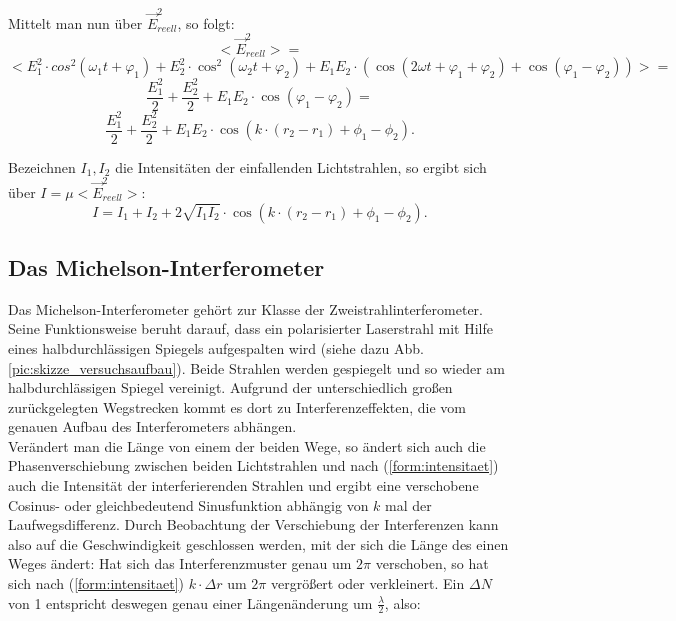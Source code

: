 Mittelt man nun über $  \vec{E}_{reell} ^{2} $, so folgt: 
\begin{equation}
\nonumber
<\vec{E}_{reell}^{2}> = 
\end{equation}
\begin{equation}
\nonumber
< E_{1}^{2} \cdot cos^{2}(\omega_{1}t + \varphi_{1}) + E_{2}^{2} \cdot \cos^{2}(\omega_{2}t + \varphi_{2}) + E_{1}E_{2} \cdot (\cos(2\omega t + \varphi_{1} + \varphi_{2}) + \cos(\varphi_{1} - \varphi_{2})) > = 
\end{equation}
\begin{equation}
\nonumber
\frac{E_{1}^{2}}{2} + \frac{E_{2}^{2}}{2} + E_{1}E_{2} \cdot \cos(\varphi_{1} - \varphi_{2}) = 
\end{equation}
\begin{equation}
\frac{E_{1}^{2}}{2} + \frac{E_{2}^{2}}{2} + E_{1}E_{2} \cdot \cos( k \cdot (r_{2} - r_{1}) + \phi_{1} - \phi_{2}).
\end{equation}

Bezeichnen $ I_{1}, I_{2} $ die Intensitäten der einfallenden Lichtstrahlen, so ergibt sich über $ I = \mu <\vec{E}_{reell}^{2}> $: 
\begin{equation}
\label{form:intensitaet}
I = I_{1} + I_{2} + 2 \sqrt{I_{1} I_{2}} \cdot \cos( k \cdot (r_{2} - r_{1}) + \phi_{1} - \phi_{2}).
\end{equation}





\subsection{Das Michelson-Interferometer}

Das Michelson-Interferometer gehört zur Klasse der Zweistrahlinterferometer. Seine Funktionsweise beruht darauf, 
dass ein polarisierter Laserstrahl mit Hilfe eines halbdurchlässigen Spiegels aufgespalten wird (siehe dazu Abb.
\ref{pic:skizze_versuchsaufbau}). Beide Strahlen werden gespiegelt und so wieder am halbdurchlässigen Spiegel 
vereinigt. Aufgrund der unterschiedlich großen zurückgelegten Wegstrecken kommt es dort zu Interferenzeffekten,
die vom genauen Aufbau des Interferometers abhängen.\\
Verändert man die Länge von einem der beiden Wege, so ändert sich auch die Phasenverschiebung zwischen beiden 
Lichtstrahlen und nach (\ref{form:intensitaet}) auch die Intensität der interferierenden Strahlen und ergibt eine verschobene 
Cosinus- oder gleichbedeutend Sinusfunktion abhängig von $ k $ mal der Laufwegsdifferenz. Durch Beobachtung der Verschiebung der Interferenzen kann also auf die Geschwindigkeit 
geschlossen werden, mit der sich die Länge des einen Weges ändert: 
Hat sich das Interferenzmuster genau um $ 2 \pi $ verschoben, so hat sich nach (\ref{form:intensitaet}) $ k \cdot \Delta r $ um $ 2 \pi $ vergrößert oder verkleinert.
Ein $ \Delta N $ von 1 entspricht deswegen genau einer Längenänderung um $ \frac{\lambda}{2} $, also:


